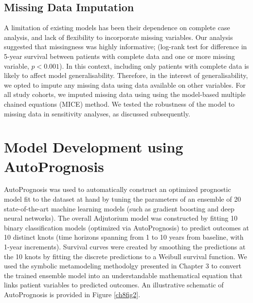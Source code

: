 \documentclass [PhD] {uclathes}
\begin{document}
\subsection{Missing Data Imputation}
A limitation of existing models has been their dependence on complete case analysis, and lack of flexibility to incorporate missing variables. Our analysis suggested that missingness was highly informative\cite{ware2012missing}; (log-rank test for difference in 5-year survival between patients with complete data and one or more missing variable, $p < 0.001$). In this context, including only patients with complete data is likely to affect model generalisability. Therefore, in the interest of generalisability, we opted to impute any missing data using data available on other variables. For all study cohorts, we imputed missing data using using the model-based multiple chained equations\cite{zhang2016multiple} (MICE) method. We tested the robustness of the model to missing data in sensitivity analyses, as discussed subsequently. 

\section{Model Development using AutoPrognosis}
\label{ch8sec2}
AutoPrognosis was used to automatically construct an optimized prognostic model fit to the dataset at hand by tuning the parameters of an ensemble of 20 state-of-the-art machine learning models (such as gradient boosting and deep neural networks). The overall Adjutorium model was constructed by fitting 10 binary classification models (optimized via AutoPrognosis) to predict outcomes at 10 distinct knots (time horizons spanning from 1 to 10 years from baseline, with 1-year increments). Survival curves were created by smoothing the predictions at the 10 knots by fitting the discrete predictions to a Weibull survival function. We used the symbolic metamodeling methodolgy presented in Chapter 3 to convert the trained ensemble model into an understandable mathematical equation that links patient variables to predicted outcomes. An illustrative schematic of AutoPrognosis is provided in Figure \ref{ch8fig2}. 
\end{document}
